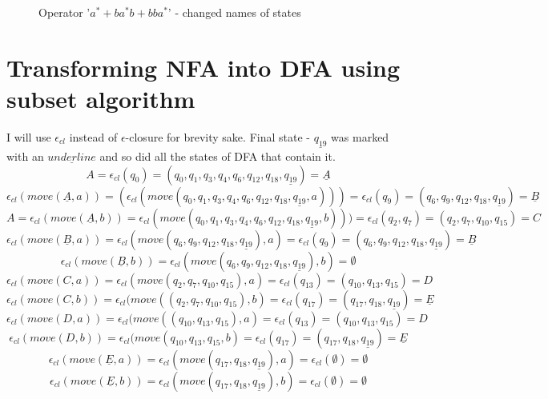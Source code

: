 \documentclass{report}[pt12]
\begin{document}
\begin{figure}[!htb]
\caption{Operator '$a^*+ba^*b + bba^*$' - changed names of states} \label{fig:finalBetter}
\end{figure}

\section{Transforming NFA into DFA using subset algorithm}
I will use $\epsilon_{cl}$ instead of $\epsilon$-closure for brevity sake.
Final state - $\underline{q_{19}}$ was marked with an $\underline{underline}$ and so did all the states of DFA that contain it.
\[ A = \epsilon_{cl}(q_0) = (q_0, q_1, q_3, q_4, q_6, q_{12}, q_{18}, \underline{q_{19}}) = \underline{A} \]
\[ \epsilon_{cl}(move(\underline{A}, a)) = (\epsilon_{cl}(move(q_0, q_1, q_3, q_4, q_6, q_{12}, q_{18}, \underline{q_{19}}, a))) = \epsilon_{cl}(q_9) = (q_6, q_9, q_{12}, q_{18}, \underline{q_{19}}) = \underline{B}  \]
\[ A = \epsilon_{cl}(move(\underline{A}, b)) = \epsilon_{cl}(move(q_0, q_1, q_3, q_4, q_6, q_{12}, q_{18}, \underline{q_{19}}, b))) = \epsilon_{cl}(q_2, q_7) = (q_2, q_7, q_{10}, q_{15}) = C \]
\[ \epsilon_{cl}(move(\underline{B}, a)) = \epsilon_{cl}(move(q_6, q_9, q_{12}, q_{18}, \underline{q_{19}}), a) = \epsilon_{cl}(q_9) = (q_6, q_9, q_{12}, q_{18}, \underline{q_{19}}) = \underline{B} \]
\[ \epsilon_{cl}(move(\underline{B}, b)) = \epsilon_{cl}(move(q_6, q_9, q_{12}, q_{18}, \underline{q_{19}}), b) = \emptyset \]
\[ \epsilon_{cl}(move(C, a)) = \epsilon_{cl}(move(q_2, q_7, q_{10}, q_{15}), a) = \epsilon_{cl}(q_{13}) = (q_{10}, q_{13}, q_{15}) = D \]
\[ \epsilon_{cl}(move(C, b)) = \epsilon_{cl}(move((q_2, q_7, q_{10}, q_{15}), b) = \epsilon_{cl}(q_{17}) = (q_{17}, q_{18}, \underline{q_{19}}) = \underline{E}  \]
\[ \epsilon_{cl}(move(D, a)) = \epsilon_{cl}(move((q_{10}, q_{13}, q_{15}), a) = \epsilon_{cl}(q_{13}) = (q_{10}, q_{13}, q_{15}) = D  \]
\[ \epsilon_{cl}(move(D, b)) = \epsilon_{cl}(move(q_{10}, q_{13}, q_{15}, b) = \epsilon_{cl}(q_{17}) = (q_{17}, q_{18}, \underline{q_{19}}) = \underline{E} \]
\[ \epsilon_{cl}(move(\underline{E}, a)) = \epsilon_{cl}(move(q_{17}, q_{18}, \underline{q_{19}}), a) = \epsilon_{cl}(\emptyset) = \emptyset \]
\[ \epsilon_{cl}(move(\underline{E}, b)) = \epsilon_{cl}(move(q_{17}, q_{18}, \underline{q_{19}}), b) = \epsilon_{cl}(\emptyset) = \emptyset \]
\end{document}

